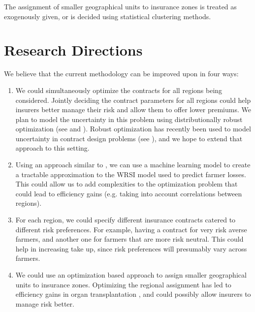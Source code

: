 \documentclass[11pt]{article}
\begin{document}
    The assignment of smaller geographical units to insurance zones is treated as exogenously given, or is decided using statistical clustering methods.

\section{Research Directions}
  We believe that the current methodology can be improved upon in four ways: 
  \begin{enumerate}
    \item We could simultaneously optimize the contracts for all regions being considered. Jointly deciding the contract parameters for all regions could help insurers better manage their risk and allow them to offer lower premiums. We plan to model the uncertainty in this problem using distributionally robust optimization (see \cite{delage2010distributionally} and \cite{bertsimas2011theory}). Robust optimization has recently been used to model uncertainty in contract design problems (see \cite{yu2020robust}), and we hope to extend that approach to this setting. 
    \item Using an approach similar to \cite{papalexopoulos2022ethics}, we can use a machine learning model to create a tractable approximation to the WRSI model used to predict farmer losses. This could allow us to add complexities to the optimization problem that could lead to efficiency gains (e.g. taking into account correlations between regions). 
    \item For each region, we could specify different insurance contracts catered to different risk preferences. For example, having a contract for very risk averse farmers, and another one for farmers that are more risk neutral. This could help in increasing take up, since risk preferences will presumably vary across farmers. 
    \item We could use an optimization based approach to assign smaller geographical units to insurance zones. Optimizing the regional assignment has led to efficiency gains in organ transplantation \cite{gentry2015gerrymandering}, and could possibly allow insurers to manage risk better. 
  \end{enumerate}


\printbibliography
\end{document}
